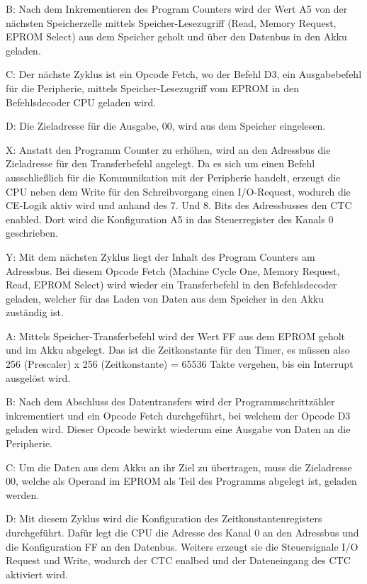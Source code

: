 B: Nach dem Inkrementieren des Program Counters wird der Wert A5 von der nächsten Speicherzelle mittels Speicher-Lesezugriff (Read, Memory Request, EPROM Select) aus dem Speicher geholt und über den Datenbus in den Akku geladen.

C: Der nächste Zyklus ist ein Opcode Fetch, wo der Befehl D3, ein Ausgabebefehl für die Peripherie, mittels Speicher-Lesezugriff vom EPROM in den Befehlsdecoder CPU geladen wird.

D: Die Zieladresse für die Ausgabe, 00, wird aus dem Speicher eingelesen.

X: Anstatt den Programm Counter zu erhöhen, wird an den Adressbus die Zieladresse für den Transferbefehl angelegt. Da es sich um einen Befehl ausschließlich für die Kommunikation mit der Peripherie handelt, erzeugt die CPU neben dem Write für den Schreibvorgang einen I/O-Request, wodurch die CE-Logik aktiv wird und anhand des 7. Und 8. Bits des Adressbusses den CTC enabled. Dort wird die Konfiguration A5 in das Steuerregister des Kanals 0 geschrieben.

Y: Mit dem nächsten Zyklus liegt der Inhalt des Program Counters am Adressbus. Bei diesem Opcode Fetch (Machine Cycle One, Memory Request, Read, EPROM Select) wird wieder ein Transferbefehl in den Befehlsdecoder geladen, welcher für das Laden von Daten aus dem Speicher in den Akku zuständig ist.

A: Mittels Speicher-Transferbefehl wird der Wert FF aus dem EPROM geholt und im Akku abgelegt. Das ist die Zeitkonstante für den Timer, es müssen also 256 (Prescaler) x 256 (Zeitkonstante) = 65536 Takte vergehen, bis ein Interrupt ausgelöst wird.

B: Nach dem Abschluss des Datentransfers wird der Programmschrittzähler inkrementiert und ein Opcode Fetch durchgeführt, bei welchem der Opcode D3 geladen wird. Dieser Opcode bewirkt wiederum eine Ausgabe von Daten an die Peripherie.

C: Um die Daten aus dem Akku an ihr Ziel zu übertragen, muss die Zieladresse 00, welche als Operand im EPROM als Teil des Programms abgelegt ist, geladen werden.

D: Mit diesem Zyklus wird die Konfiguration des Zeitkonstantenregisters durchgeführt. Dafür legt die CPU die Adresse des Kanal 0 an den Adressbus und die Konfiguration FF an den Datenbus. Weiters erzeugt sie die Steuersignale I/O Request und Write, wodurch der CTC enalbed und der Dateneingang des CTC aktiviert wird.

